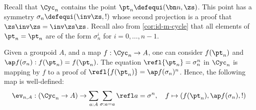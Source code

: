 Recall that $\Cyc_n$ contains the point $\pt_n \defequi (\bn n, \zs)$. This
point has a symmetry $\sigma_n \defequi (\inv\zs, !)$ whose second projection is a
proof that $\zs\inv\zs = \inv\zs\zs$.
%
Recall also from \cref{cor:id-m-cycle} that all elements of $\pt_n = \pt_n$ are
of the form $\sigma_n^i$ for $i=0,\dots,n-1$.

Given a groupoid $A$, and a map $f :
\Cyc_n \to A$, one can consider $f(\pt_n)$ and $\ap f (\sigma_n): f(\pt_n) =
f(\pt_n)$. The equation $\refl {\pt_n} = \sigma_n^n$ in
$\Cyc_n$ is mapping by $f$ to a proof of $\refl {f(\pt_n)} =
\ap f(\sigma_n)^n$. Hence, the following map is well-defined:
\begin{displaymath}
  \ev_{n,A} : (\Cyc_n \to A) \to \sum_{a:A}\sum_{\sigma:a=a}\refl a = \sigma^n,\quad
  f \mapsto (f(\pt_n), \ap f (\sigma_n), !)
\end{displaymath}

